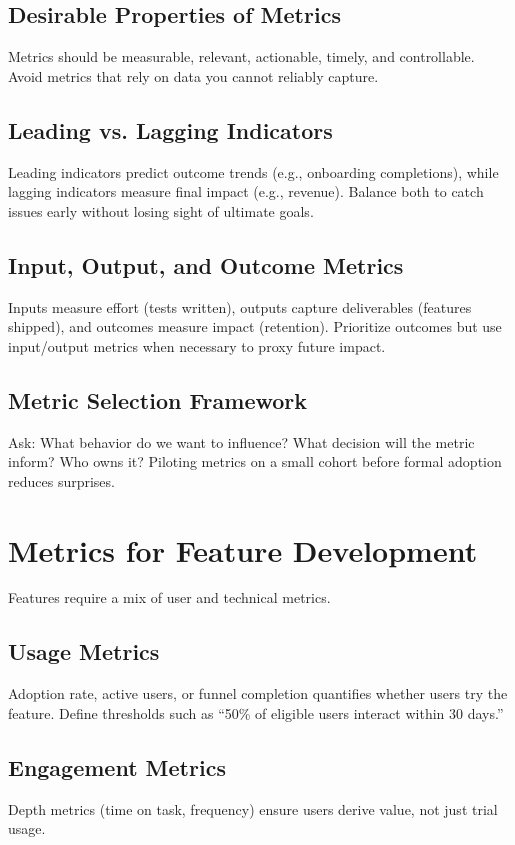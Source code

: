 \subsection{Desirable Properties of Metrics}
Metrics should be measurable, relevant, actionable, timely, and controllable. Avoid metrics that rely on data you cannot reliably capture.

\subsection{Leading vs. Lagging Indicators}
Leading indicators predict outcome trends (e.g., onboarding completions), while lagging indicators measure final impact (e.g., revenue). Balance both to catch issues early without losing sight of ultimate goals.

\subsection{Input, Output, and Outcome Metrics}
Inputs measure effort (tests written), outputs capture deliverables (features shipped), and outcomes measure impact (retention). Prioritize outcomes but use input/output metrics when necessary to proxy future impact.

\subsection{Metric Selection Framework}
Ask: What behavior do we want to influence? What decision will the metric inform? Who owns it? Piloting metrics on a small cohort before formal adoption reduces surprises.

\section{Metrics for Feature Development}
\label{sec:feature-metrics}

Features require a mix of user and technical metrics.

\subsection{Usage Metrics}
Adoption rate, active users, or funnel completion quantifies whether users try the feature. Define thresholds such as ``50\% of eligible users interact within 30 days.''

\subsection{Engagement Metrics}
Depth metrics (time on task, frequency) ensure users derive value, not just trial usage.

